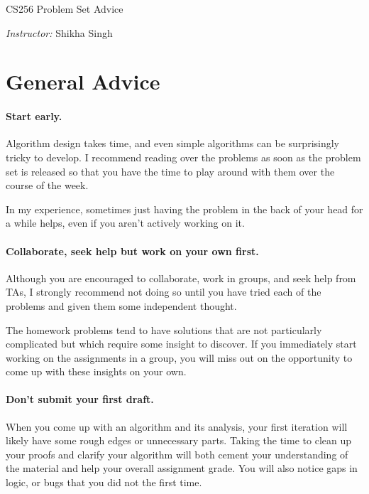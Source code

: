 \documentclass{article}
\theoremstyle{definition}
\begin{document}

\begin{center}
    {\Large \sc CS256 Problem Set Advice}\\ 
\end{center}

\begin{center}
{\em Instructor:} Shikha Singh\\
\end{center}

\section{General Advice}

\paragraph{Start early.}
Algorithm design takes time, and even simple algorithms
can be surprisingly tricky to develop. I recommend reading over the problems as soon as
the problem set is released so that you have the time to play around with them over the
course of the week.  


In my experience, sometimes just having the problem in the back of your head for a while helps, even
if you aren't actively working on it.

\paragraph{Collaborate, seek help but work on your own first.}  
  Although you are encouraged to collaborate, work in groups, and seek help from TAs, I strongly recommend not doing so until you have tried each of the problems and given them some independent thought. 

The homework problems tend to have solutions that are not particularly complicated but which require some
insight to discover. If you immediately start working on the assignments in a group, you
will miss out on the opportunity to come up with these insights on your own. 

\paragraph{Don't submit your first draft.} 
When you come up with an algorithm and its analysis, your first iteration will likely have some rough edges or unnecessary parts. Taking the time to clean up your proofs and clarify your algorithm will
both cement your understanding of the material and help your overall assignment grade.  You will also notice gaps in logic, or bugs that you did not the first time. 
\end{document}
